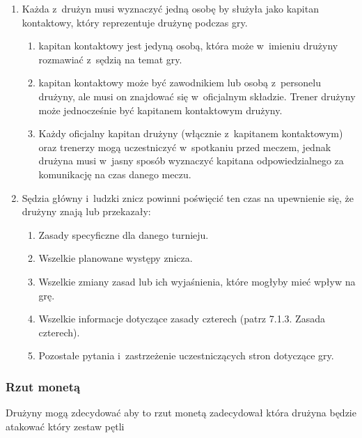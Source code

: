 \documentclass[12pt]{article}
\begin{document}
\begin{enumerate}
	\item
	      Każda z~drużyn musi wyznaczyć jedną osobę by służyła jako kapitan
	      kontaktowy, który reprezentuje drużynę podczas gry.

	      \begin{enumerate}
		      \item
		            kapitan kontaktowy jest jedyną osobą, która może w~imieniu drużyny
		            rozmawiać z~sędzią na temat gry.
		      \item
		            kapitan kontaktowy może być zawodnikiem lub osobą z~personelu
		            drużyny, ale musi on znajdować się w~oficjalnym składzie. Trener
		            drużyny może jednocześnie być kapitanem kontaktowym drużyny.
		      \item
		            Każdy oficjalny kapitan drużyny (włącznie z~kapitanem kontaktowym)
		            oraz trenerzy mogą uczestniczyć w~spotkaniu przed meczem, jednak
		            drużyna musi w~jasny sposób wyznaczyć kapitana odpowiedzialnego za
		            komunikację na czas danego meczu.
	      \end{enumerate}
	\item
	      Sędzia główny i~ludzki znicz powinni poświęcić ten czas na upewnienie
	      się, że drużyny znają lub przekazały:

	      \begin{enumerate}
		      \item
		            Zasady specyficzne dla danego turnieju.
		      \item
		            Wszelkie planowane występy znicza.
		      \item
		            Wszelkie zmiany zasad lub ich wyjaśnienia, które mogłyby mieć wpływ
		            na grę.
		      \item
		            Wszelkie informacje dotyczące zasady czterech (patrz 7.1.3. Zasada
		            czterech).
		      \item
		            Pozostałe pytania i~zastrzeżenie uczestniczących stron dotyczące
		            gry.
	      \end{enumerate}
\end{enumerate}

\subsubsection{Rzut monetą}
Drużyny mogą zdecydować aby to rzut
monetą zadecydował która drużyna będzie atakować który zestaw pętli
\end{document}
